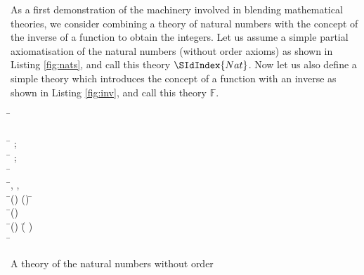 As a first demonstration of the machinery involved in blending
mathematical theories, we consider combining a theory of natural
numbers with the concept of the inverse of a function to obtain the
integers. Let us assume a simple partial axiomatisation of the natural
numbers (without order axioms) as shown in Listing \ref{fig:nats}, and
call this theory $\SIdIndex{Nat}$. Now let us also define a simple theory
which introduces the concept of a function with an inverse as shown in
Listing \ref{fig:inv}, and call this theory $\mathbb{F}$. 
\begin{listing}[!ht]
\begin{mdframed}
\begin{hetcasl}
\SPEC \= \Ax{=}\\
\> \SORT {}\\
\> \OPS \= \Ax{:} ;\\
\>\>  \Ax{:} \= \Ax{\rightarrow} ;\\
\>\> \Ax{\_\_}\Ax{+}\Ax{\_\_} \Ax{:} \= \Ax{\times}  \Ax{\rightarrow} \\
\> \Ax{\forall} \=, ,  \Ax{:}  \\
\> \Ax{\bullet} \=() \Ax{=} () \Ax{\Rightarrow} \= \Ax{=} \\
\> \Ax{\bullet} \Ax{\neg} \=() \Ax{=} \\
\> \Ax{\bullet} \=() \Ax{+}  \Ax{=} (\= \Ax{+} )\\
\> \Ax{\bullet} \= \Ax{+}  \Ax{=} \\
\end{hetcasl}
\end{mdframed}
\caption{A theory of the natural numbers without order}
\label{fig:nats}
\end{listing}

